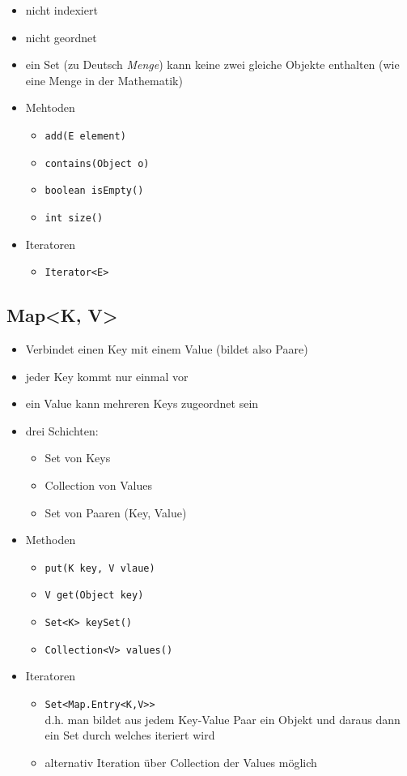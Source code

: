 \begin{itemize}
	\item nicht indexiert
	\item nicht geordnet
	\item ein Set (zu Deutsch \textit{Menge}) kann keine zwei gleiche 
		Objekte enthalten (wie eine Menge in der Mathematik)
	\item Mehtoden
		\begin{itemize}
			\item \lstinline{add(E element)}
			\item \lstinline{contains(Object o)}
			\item \lstinline{boolean isEmpty()}
			\item \lstinline{int size()}
		\end{itemize}
	\item Iteratoren
		\begin{itemize}
			\item \lstinline{Iterator<E>}
		\end{itemize}
\end{itemize}

\subsection{Map<K, V>}

\begin{itemize}
	\item Verbindet einen Key mit einem Value (bildet also Paare)
	\item jeder Key kommt nur einmal vor
	\item ein Value kann mehreren Keys zugeordnet sein
	\item drei Schichten:
		\begin{itemize}
			\item Set von Keys
			\item Collection von Values
			\item Set von Paaren (Key, Value)
		\end{itemize}
	\item Methoden
		\begin{itemize}
			\item \lstinline{put(K key, V vlaue)}
			\item \lstinline{V get(Object key)}
			\item \lstinline{Set<K> keySet()}
			\item \lstinline{Collection<V> values()}
		\end{itemize}
	\item Iteratoren
		\begin{itemize}
			\item \lstinline{Set<Map.Entry<K,V>>} \\
				d.h. man bildet aus jedem Key-Value
				Paar ein Objekt und daraus dann ein Set
				durch welches iteriert wird
			\item alternativ Iteration über Collection der
				Values möglich
		\end{itemize}
\end{itemize}

